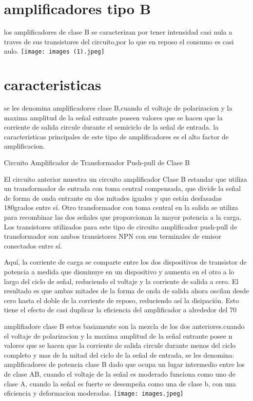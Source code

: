 \documentclass[10pt,a4paper]{article}
\author\part{Marco Antonio Vargas Diaz}
\begin{document}
\section{amplificadores tipo B}
los amplificadores de clase B se caracterizan por tener intensidad casi nula a traves de sus transistores del circuito,por lo que en reposo el consumo es casi nulo.
\texttt{[image: images (1).jpeg]} 
\section{caracteristicas}
se les denomina amplificadores clase B,cuando el voltaje de polarizacion y la maxima amplitud de la señal entrante poseen valores que se hacen que la corriente de salida circule durante el semiciclo de la señal de entrada.
la caracteristicas principales de este tipo de amplificadores es el alto factor de amplificacion.

Circuito Amplificador de Transformador Push-pull de Clase B


El circuito anterior muestra un circuito amplificador Clase B estandar que utiliza un transformador de entrada con toma central compensada, que divide la señal de forma de onda entrante en dos mitades iguales y que están desfasadas 180grados entre sí. Otro transformador con toma central en la salida se utiliza para recombinar las dos señales que proporcionan la mayor potencia a la carga. Los transistores utilizados para este tipo de circuito amplificador push-pull de transformador son ambos transistores NPN con sus terminales de emisor conectados entre sí.

Aquí, la corriente de carga se comparte entre los dos dispositivos de transistor de potencia a medida que disminuye en un dispositivo y aumenta en el otro a lo largo del ciclo de señal, reduciendo el voltaje y la corriente de salida a cero. El resultado es que ambas mitades de la forma de onda de salida ahora oscilan desde cero hasta el doble de la corriente de reposo, reduciendo así la disipación. Esto tiene el efecto de casi duplicar la eficiencia del amplificador a alrededor del 70%

amplifiadore clase B estos basiamente son la mezcla de los dos anteriores.cuando el voltaje de polarizacion y la maxima amplitud de la señal entrante posee n valores que se hacen que la corriente de salida circule durante menos del ciclo completo y mas de la mitad del ciclo de la señal de entrada, se les denomina: amplificadores de potencia clase B
dado que ocupa un lugar intermedio entre los de clase AB, cuando el voltaje de la señal es moderado funciona como uno de clase A, cuando la señal es fuerte se desempeña como una de clase b, con una eficiencia y deformacion moderadas.
\texttt{[image: images.jpeg]} 
\end{document}
